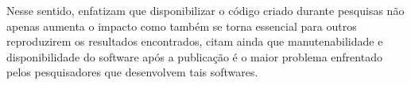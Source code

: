%
%

Nesse sentido,  enfatizam que disponibilizar o código
criado durante pesquisas não apenas aumenta o impacto como também se torna
essencial para outros reproduzirem os resultados encontrados, citam ainda que
manutenabilidade e disponibilidade do software após a publicação é o maior
problema enfrentado pelos pesquisadores que desenvolvem tais softwares.

